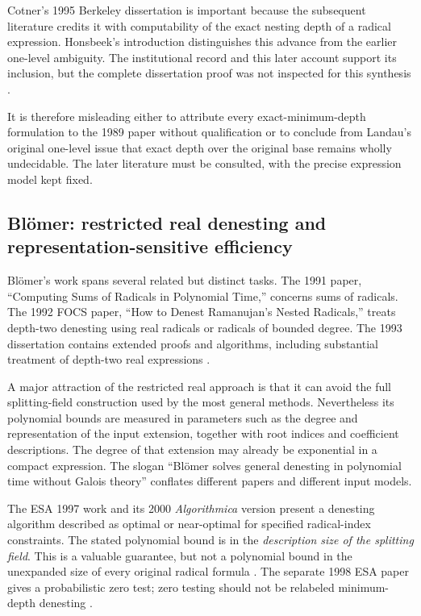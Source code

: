 \documentclass[11pt,oneside]{article}
\numberwithin{equation}{section}
\theoremstyle{definition}
\theoremstyle{remark}
\begin{document}
Cotner's 1995 Berkeley dissertation is important because the subsequent literature credits it with computability of the exact nesting depth of a radical expression. Honsbeek's introduction distinguishes this advance from the earlier one-level ambiguity. The institutional record and this later account support its inclusion, but the complete dissertation proof was not inspected for this synthesis \cite{cotner,honsbeek}.

It is therefore misleading either to attribute every exact-minimum-depth formulation to the 1989 paper without qualification or to conclude from Landau's original one-level issue that exact depth over the original base remains wholly undecidable. The later literature must be consulted, with the precise expression model kept fixed.

\subsection{Bl\"omer: restricted real denesting and representation-sensitive efficiency}
Bl\"omer's work spans several related but distinct tasks. The 1991 paper, ``Computing Sums of Radicals in Polynomial Time,'' concerns sums of radicals. The 1992 FOCS paper, ``How to Denest Ramanujan's Nested Radicals,'' treats depth-two denesting using real radicals or radicals of bounded degree. The 1993 dissertation contains extended proofs and algorithms, including substantial treatment of depth-two real expressions \cite{blomer91,blomer92,blomerthesis}.

A major attraction of the restricted real approach is that it can avoid the full splitting-field construction used by the most general methods. Nevertheless its polynomial bounds are measured in parameters such as the degree and representation of the input extension, together with root indices and coefficient descriptions. The degree of that extension may already be exponential in a compact expression. The slogan ``Bl\"omer solves general denesting in polynomial time without Galois theory'' conflates different papers and different input models.

The ESA 1997 work and its 2000 \emph{Algorithmica} version present a denesting algorithm described as optimal or near-optimal for specified radical-index constraints. The stated polynomial bound is in the \emph{description size of the splitting field}. This is a valuable guarantee, but not a polynomial bound in the unexpanded size of every original radical formula \cite{blomer2000}. The separate 1998 ESA paper gives a probabilistic zero test; zero testing should not be relabeled minimum-depth denesting \cite{blomer98}.
\end{document}
